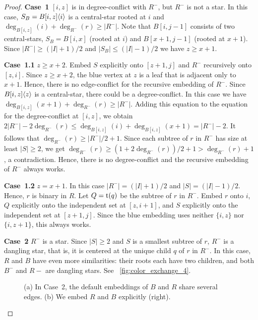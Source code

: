 \documentclass[11pt,a4paper,colorlinks=true,urlcolor=blue,citecolor=red]{article}
\theoremstyle{plain}
\newcommand{\case}[1]{\par\vspace{.5\baselineskip}\noindent\textbf{\sffamily Case~#1}}
\begin{document}
\begin{proof}
\case{1} $[i,z]$ is in degree-conflict with $R^-$, but $R^-$ is not a
star. In this case, $S_B=B{[i,z]}\langle{i}\rangle$ is a central-star
rooted at $i$ and $\deg_{B[i,z]}(i)+\deg_{R^-}(r)\geq |R^-|$. Note that
$B[i,j-1]$ consists of two central-stars, $S_B=B[i,x]$ (rooted at $i$)
and $B[x+1,j-1]$ (rooted at $x+1$). Since $|R^-|\geq(|I|+1)/2$ and
$|S_B|\leq(|I|-1)/2$ we have $z\geq x+1$.

\case{1.1} $z\geq x+2$. Embed $S$ explicitly onto $[z+1,j]$ and $R^-$
recursively onto $[z,i]$. Since $z\geq x+2$, the blue vertex at $z$ is a
leaf that is adjacent only to $x+1$. Hence, there is no edge-conflict
for the recursive embedding of $R^-$. Since $B{[i,z]}\langle{z}\rangle$ is a
central-star, there could be a degree-conflict. In this case we have
$\deg_{B[i,z]}(x+1)+\deg_{R^-}(r)\geq|R^-|$. Adding this equation to the
equation for the degree-conflict at $[i,z]$, we obtain
$2|R^-|-2\deg_{R^-}(r)\leq \deg_{B[i,z]}(i)+\deg_{B[i,z]}(x+1)=|R^-|-2$.
It follows that $\deg_{R^-}(r)\geq |R^-|/2+1$. Since each subtree of $r$
in $R^-$ has size at least $|S|\geq2$, we get
$\deg_{R^-}(r)\geq(1+2\deg_{R^-}(r))/2+1>\deg_{R^-}(r)+1$, a
contradiction. Hence, there is no degree-conflict and the recursive
embedding of $R^-$ always works.

\case{1.2} $z=x+1$. In this case $|R^-|=(|I|+1)/2$ and $|S|=(|I|-1)/2$.
Hence, $r$ is binary in $R$. Let $Q=\mathrm t(q)$ be the subtree of $r$ in
$R^-$. Embed $r$ onto $i$, $Q$ explicitly onto the independent set at
$[z,i+1]$, and $S$ explicitly onto the independent set at $[z+1,j]$.
Since the blue embedding uses neither $\{i,z\}$ nor $\{i,z+1\}$, this
always works.

\case{2} $R^-$ is a star. Since $|S|\geq2$ and $S$ is a smallest subtree
of $r$, $R^-$ is a dangling star, that is, it is centered at the unique
child $q$ of $r$ in $R^-$. In this case, $R$ and $B$ have even more similarities:
their roots each have two children, and both $B^-$ and $R-$ are dangling stars.
See \figurename~\ref{fig:color_exchange_4}.

\begin{figure}[htbp]
  \centering
  \hfil {}\hfil \caption{(a) In Case~2, the default embeddings of $B$ and $R$ share
    several edges. (b) We embed $R$ and $B$ explicitly
    (right).\label{fig:color_exchange_again} }
\end{figure}


\end{proof}
\end{document}
